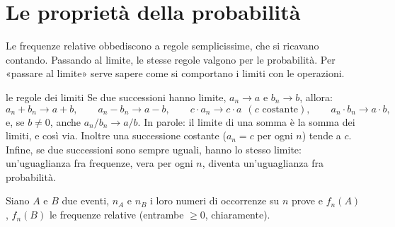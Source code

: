 \section{Le proprietà della probabilità}

Le frequenze relative obbediscono a regole semplicissime, che si ricavano contando. Passando al limite, le stesse
regole valgono per le probabilità. Per «passare al limite» serve sapere come si comportano i limiti con le operazioni.

\begin{richiamo}{le regole dei limiti}
Se due successioni hanno limite, $a_n \to a$ e $b_n \to b$, allora:
\[
  a_n + b_n \to a + b , \qquad a_n - b_n \to a - b , \qquad c \cdot a_n \to c \cdot a \ \ (c \text{ costante}) ,
  \qquad a_n \cdot b_n \to a \cdot b ,
\]
e, se $b \neq 0$, anche $a_n / b_n \to a / b$. In parole: il limite di una somma è la somma dei limiti, e così via.
Inoltre una successione costante ($a_n = c$ per ogni $n$) tende a $c$. Infine, se due successioni sono sempre uguali,
hanno lo stesso limite: un'uguaglianza fra frequenze, vera per ogni $n$, diventa un'uguaglianza fra probabilità.
\end{richiamo}

Siano $A$ e $B$ due eventi, $n_A$ e $n_B$ i loro numeri di occorrenze su $n$ prove e $f_n(A)$, $f_n(B)$ le frequenze
relative (entrambe $\geq 0$, chiaramente).


